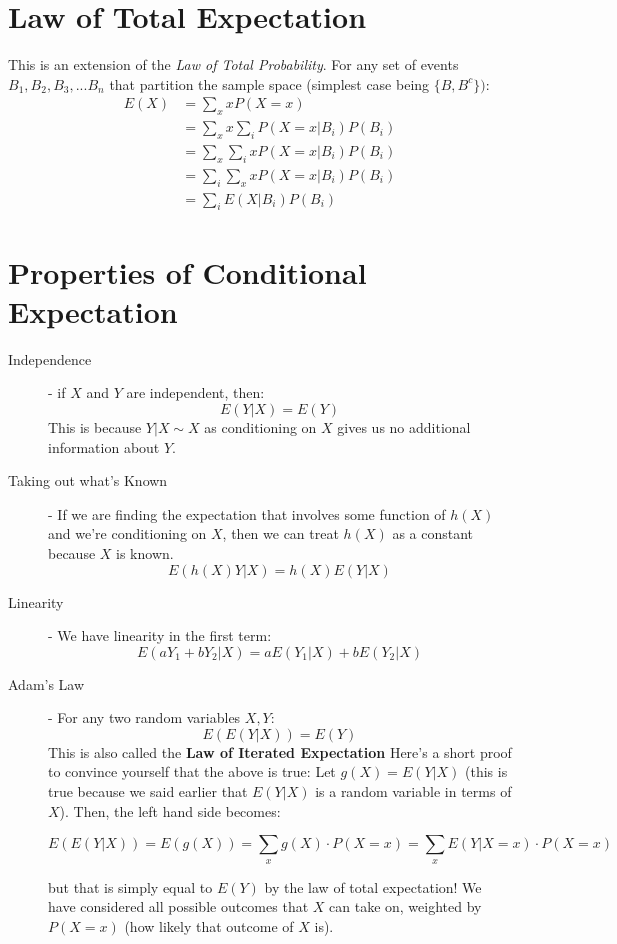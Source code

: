 \documentclass[11.5pt]{article}
\begin{document}
\begin{notes}
\begin{description}
\end{description}
\section*{Law of Total Expectation}
This is an extension of the \emph{Law of Total Probability}. For any set of events $B_1, B_2, B_3, ... B_n$ that partition the sample space (simplest case being $\{B, B^c\})$:
\begin{align*}
    E(X) &= \sum_{x} x P(X=x) \\
    &= \sum_{x} x \sum_{i} P(X =x| B_i) P(B_i)\\
    &= \sum_x \sum_i xP(X=x | B_i) P(B_i)\\
    &= \sum_i \sum_x xP(X=x|B_i) P(B_i)\\
    &= \sum_i E(X|B_i)P(B_i)
\end{align*}

\section*{Properties of Conditional Expectation}
\begin{description}
\item [Independence] - if $X$ and $Y$ are independent, then: 
$$ E(Y | X) = E(Y)$$ 
This is because $Y | X \sim X$ as conditioning on $X$ gives us no additional information about $Y$. 

\item [Taking out what's Known] - If we are finding the expectation that involves some function of $h(X)$ and we're conditioning on $X$, then we can treat $h(X)$ as a constant because $X$ is known. 
$$ E(h(X) Y | X) = h(X) E(Y | X)$$
 
\item [Linearity] - We have linearity in the first term: 
$$ E(aY_1 + bY_2 | X) = a E(Y_1 | X) + bE(Y_2 | X)$$

\item [Adam's Law] - For any two random variables $X,Y$: 
$$ E(E(Y | X)) = E(Y)$$
This is also called the \textbf{Law of Iterated Expectation}
Here's a short proof to convince yourself that the above is true: 
Let $g(X) = E(Y|X)$ (this is true because we said earlier that $E(Y|X)$ is a random variable in terms of $X$). Then, the left hand side becomes: 

$$ E(E(Y|X)) = E(g(X)) = \sum_{x} g(X) \cdot P(X = x) = \sum_x E(Y | X=x) \cdot P(X = x)$$

but that is simply equal to $E(Y)$ by the law of total expectation! We have considered all possible outcomes that $X$ can take on, weighted by $P(X = x)$ (how likely that outcome of $X$ is). \\


\end{description}
\end{notes}
\end{document}
